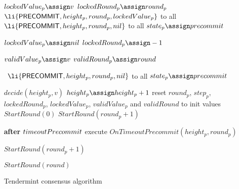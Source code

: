 \begin{algorithm}[htb!]
\begin{algorithmic}[1]
\SPACE
{} \label{line:tab:recvPrevote}
  \STATE $lockedValue_p \assign v$   \label{line:tab:setLockedValue}
  \STATE $lockedRound_p \assign round_p$   \label{line:tab:setLockedRound} 
   \STATE \PBroadcast \ $\li{\Precommit,height_p,round_p,lockedValue_p}$ to all \label{line:tab:send-precommit}
 \ELSE 
   \STATE \PBroadcast \ $\li{\Precommit,height_p,round_p,\nil}$ to all \label{line:tab:send-precommit-nil}	
 \ENDIF
 \STATE $state_p \assign \precommit$ \label{line:tab:setStateToCommit}
\ENDUPON

\SPACE
{}  \label{line:tab:unlockRule}
\IF{$v \neq lockedValue_p$}	
	\STATE $lockedValue_p \assign \nil$
	\STATE $lockedRound_p \assign -1$	
\ENDIF		
\ENDUPON

\SPACE
{}  \label{line:tab:validValueRule}
	\STATE $validValue_p \assign v$  \label{line:tab:setValidValue}
	\STATE $validRound_p \assign round$  \label{line:tab:setValidRound}
\ENDUPON

\SPACE
{} \label{line:tab:onTimeoutPrevote}
  \STATE \PBroadcast \ $\li{\Precommit,height_p,round_p,\nil}$ to all  \label{line:tab:precommit-nil-onTimeout}
  \STATE $state_p \assign \precommit$  
\ENDIF	
\ENDFUNCTION

\SPACE
{} \label{line:tab:onPrecommitRule}
	   \STATE $decide(height_p, v)$ \label{line:tab:decide}
	   \STATE$height_p \assign height_p + 1$
	   \STATE reset $round_p$, $step_p$, $lockedRound_p$, $lockedValue_p$, $validValue_p$ and $validRound$ to init values    
	   \STATE $StartRound(0)$
  \ENDIF
  \IF{$round_p = round$}
    \STATE $StartRound(round_p+1)$
  \ENDIF  	
\ENDUPON
 
\SPACE
{} \label{line:tab:startTimeoutPrecommit}
	\STATE \textbf{after} $timeoutPrecommit$ execute $OnTimeoutPrecommit(height_p, round_p)$
\ENDUPON 

\SPACE
{} \label{line:tab:onTimeoutPrecommit}
\STATE $StartRound(round_p+1)$
\ENDIF	
\ENDFUNCTION

\SPACE
{} \label{line:tab:skipRounds}
  \STATE $StartRound(round)$
\ENDUPON

\end{algorithmic}
\caption{Tendermint consensus algorithm}
\label{alg:tendermint}
\end{algorithm}


